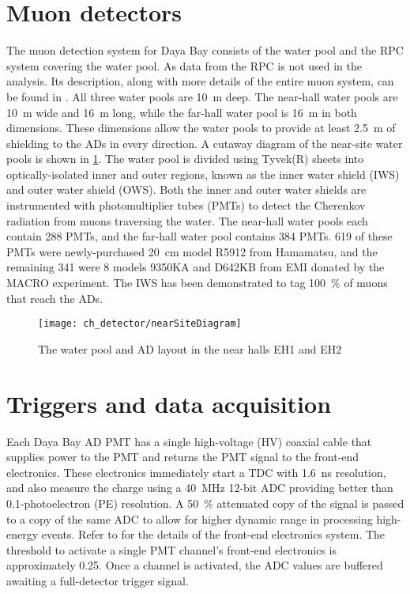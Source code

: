 \section{Muon detectors}

The muon detection system for Daya Bay consists of
the water pool and the RPC system covering the water pool.
As data from the RPC is not used in the \thetaot{} analysis.
Its description, along with more details of the entire muon system,
can be found in \cite{muonsystem2015}.
All three water pools are \SI{10}{\m} deep.
The near-hall water pools are \SI{10}{\m} wide and \SI{16}{\m} long,
while the far-hall water pool is \SI{16}{\m} in both dimensions.
These dimensions allow the water pools to provide at least \SI{2.5}{\m} of shielding
to the ADs in every direction.
A cutaway diagram of the near-site water pools is shown in \cref{fig:wpcutout}.
The water pool is divided using Tyvek(R) sheets
into optically-isolated inner and outer regions,
known as the inner water shield (IWS) and outer water shield (OWS).
Both the inner and outer water shields are instrumented with photomultiplier tubes (PMTs)
to detect the Cherenkov radiation from muons traversing the water.
The near-hall water pools each contain \num{288} PMTs,
and the far-hall water pool contains \num{384} PMTs.
\num{619} of these PMTs were newly-purchased \SI{20}{\cm}
model R5912 from Hamamatsu,
and the remaining \num{341} were \SI{8}{\inch} models 9350KA
and D642KB from EMI
donated by the MACRO experiment.
The IWS has been demonstrated to tag \SI{100}{\percent} of muons
that reach the ADs.

\begin{figure}
    \centering
    \texttt{[image: ch\_detector/nearSiteDiagram]}
    \caption{The water pool and AD layout in the near halls EH1 and EH2}
    \label{fig:wpcutout}
\end{figure}



\section{Triggers and data acquisition}
\label{sec:daq}

Each Daya Bay AD PMT has a single high-voltage (HV) coaxial cable
that supplies power to the PMT and returns the PMT signal to the
front-end electronics.
These electronics immediately start a TDC with \SI{1.6}{\ns} resolution,
and also measure the charge using a \SI{40}{\MHz} \num{12}-bit ADC
providing better than \num{0.1}-photoelectron (PE) resolution.
A \SI{50}{\percent} attenuated copy of the signal is passed to a copy
of the same ADC to allow for higher dynamic range in processing high-energy
events.
Refer to \cite[Sec.~II]{ngd2016} for the details
of the front-end electronics system.
The threshold to activate a single PMT channel's front-end electronics
is approximately \SI{0.25}{\pe}.
Once a channel is activated, the ADC values are buffered
awaiting a full-detector trigger signal.

